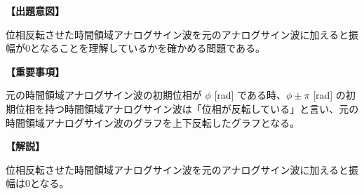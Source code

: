 \noindent \textbf{【出題意図】}

\noindent 位相反転させた時間領域アナログサイン波を元のアナログサイン波に加えると振幅が0となることを理解しているかを確かめる問題である。

\vspace{1em}
\noindent \textbf{【重要事項】}

\bigskip
元の時間領域アナログサイン波の初期位相が $\phi$ [rad] である時、$\phi \pm \pi$ [rad] の初期位相を持つ時間領域アナログサイン波は「位相が反転している」と言い、元の時間領域アナログサイン波のグラフを上下反転したグラフとなる。

\vspace{1em}
\noindent \textbf{【解説】}

\noindent 位相反転させた時間領域アナログサイン波を元のアナログサイン波に加えると振幅は0となる。
